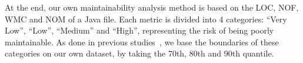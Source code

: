 At the end, our own maintainability analysis method is based on the LOC, NOF, WMC and NOM of a Java file. Each metric is divided into 4 categories: ``Very Low'', ``Low'', ``Medium'' and ``High'', representing the risk of being poorly maintainable. As done in previous studies~\cite{alves2010deriving}, we base the boundaries of these categories on our own dataset, by taking the 70th, 80th and 90th quantile.

